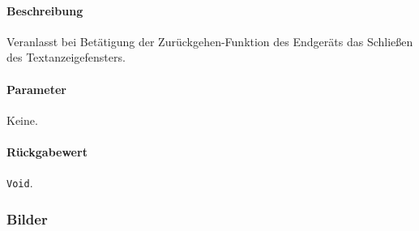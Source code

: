\paragraph*{Beschreibung}
Veranlasst bei Betätigung der Zurückgehen-Funktion des Endgeräts das Schließen des Textanzeigefensters.
\paragraph*{Parameter}
Keine.
\paragraph*{Rückgabewert}
\texttt{Void}.

\subsubsection*{Bilder}
\begin{minipage}{\linewidth}
    \centering
    \begin{minipage}{.49\textwidth}
        \captionsetup[figure]{labelformat=empty}
        \captionsetup[figure]{labelformat=default}
    \end{minipage}
\end{minipage}
